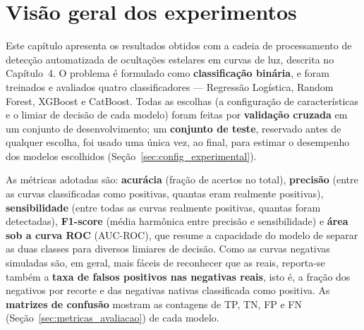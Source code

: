 
\section{Visão geral dos experimentos}
\label{sec:visao_geral_resultados}

Este capítulo apresenta os resultados obtidos com a cadeia de processamento de detecção automatizada de ocultações estelares em curvas de luz, descrita no Capítulo~4. O problema é formulado como \textbf{classificação binária}, e foram treinados e avaliados quatro classificadores --- Regressão Logística, Random Forest, XGBoost e CatBoost. Todas as escolhas (a configuração de características e o limiar de decisão de cada modelo) foram feitas por \textbf{validação cruzada} em um conjunto de desenvolvimento; um \textbf{conjunto de teste}, reservado antes de qualquer escolha, foi usado uma única vez, ao final, para estimar o desempenho dos modelos escolhidos (Seção~\ref{sec:config_experimental}).

As métricas adotadas são: \textbf{acurácia} (fração de acertos no total), \textbf{precisão} (entre as curvas classificadas como positivas, quantas eram realmente positivas), \textbf{sensibilidade} (entre todas as curvas realmente positivas, quantas foram detectadas), \textbf{F1-score} (média harmônica entre precisão e sensibilidade) e \textbf{área sob a curva ROC} (AUC-ROC), que resume a capacidade do modelo de separar as duas classes para diversos limiares de decisão. Como as curvas negativas simuladas são, em geral, mais fáceis de reconhecer que as reais, reporta-se também a \textbf{taxa de falsos positivos nas negativas reais}, isto é, a fração dos negativos por recorte e das negativas nativas classificada como positiva. As \textbf{matrizes de confusão} mostram as contagens de TP, TN, FP e FN (Seção~\ref{sec:metricas_avaliacao}) de cada modelo.

